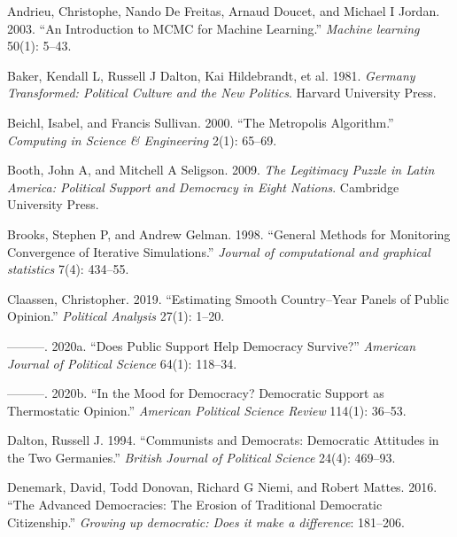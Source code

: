 \documentclass[12pt,english,a4paper,oneside]{article}
\newlength{\cslhangindent}
\newlength{\cslentryspacingunit} %
\newenvironment{CSLReferences}[2] %
 {%
  \setlength{\parindent}{0pt}
  \ifodd #1
  \let\oldpar\par
  \def\par{\hangindent=\cslhangindent\oldpar}
  \fi
  \setlength{\parskip}{#2\cslentryspacingunit}
 }%
 {}
\theoremstyle{definition}
\theoremstyle{definition}
\theoremstyle{definition}
\theoremstyle{definition}
\theoremstyle{remark}
\begin{document}
\hypertarget{refs}{}
\begin{CSLReferences}{1}{0}
\leavevmode{}%
Andrieu, Christophe, Nando De Freitas, Arnaud Doucet, and Michael I Jordan. 2003. {``An Introduction to MCMC for Machine Learning.''} \emph{Machine learning} 50(1): 5--43.

\leavevmode{}%
Baker, Kendall L, Russell J Dalton, Kai Hildebrandt, et al. 1981. \emph{Germany Transformed: Political Culture and the New Politics}. Harvard University Press.

\leavevmode{}%
Beichl, Isabel, and Francis Sullivan. 2000. {``The Metropolis Algorithm.''} \emph{Computing in Science \& Engineering} 2(1): 65--69.

\leavevmode{}%
Booth, John A, and Mitchell A Seligson. 2009. \emph{The Legitimacy Puzzle in Latin America: Political Support and Democracy in Eight Nations}. Cambridge University Press.

\leavevmode{}%
Brooks, Stephen P, and Andrew Gelman. 1998. {``General Methods for Monitoring Convergence of Iterative Simulations.''} \emph{Journal of computational and graphical statistics} 7(4): 434--55.

\leavevmode{}%
Claassen, Christopher. 2019. {``Estimating Smooth Country--Year Panels of Public Opinion.''} \emph{Political Analysis} 27(1): 1--20.

\leavevmode{}%
---------. 2020a. {``Does Public Support Help Democracy Survive?''} \emph{American Journal of Political Science} 64(1): 118--34.

\leavevmode{}%
---------. 2020b. {``In the Mood for Democracy? Democratic Support as Thermostatic Opinion.''} \emph{American Political Science Review} 114(1): 36--53.

\leavevmode{}%
Dalton, Russell J. 1994. {``Communists and Democrats: Democratic Attitudes in the Two Germanies.''} \emph{British Journal of Political Science} 24(4): 469--93.

\leavevmode{}%
Denemark, David, Todd Donovan, Richard G Niemi, and Robert Mattes. 2016. {``The Advanced Democracies: The Erosion of Traditional Democratic Citizenship.''} \emph{Growing up democratic: Does it make a difference}: 181--206.


\end{CSLReferences}
\end{document}
